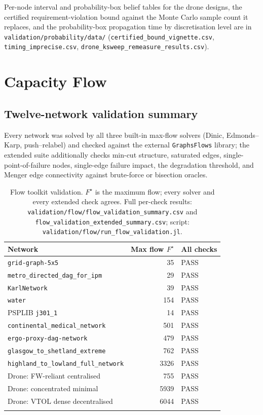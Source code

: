 \documentclass[12pt]{report}
\providecommand{\filepath}[1]{\nolinkurl{#1}}
\begin{document}
Per-node interval and probability-box belief tables for the drone designs, the certified
requirement-violation bound against the Monte Carlo sample count it replaces, and the
probability-box propagation time by discretisation level are in
\filepath{validation/probability/data/} (\filepath{certified_bound_vignette.csv},
\filepath{timing_imprecise.csv}, \filepath{drone_ksweep_remeasure_results.csv}).

\section{Capacity Flow}
\label{sec:appB-flow}

\subsection{Twelve-network validation summary}

Every network was solved by all three built-in max-flow solvers (Dinic, Edmonds--Karp,
push--relabel) and checked against the external \texttt{GraphsFlows} library; the extended
suite additionally checks min-cut structure, saturated edges, single-point-of-failure
nodes, single-edge failure impact, the degradation threshold, and Menger edge
connectivity against brute-force or bisection oracles.

{\footnotesize
\begin{longtable}{@{}l r l@{}}
\toprule
Network & Max flow $F^\star$ & All checks \\
\midrule
\endhead
\texttt{grid-graph-5x5}                  & 35   & PASS \\
\filepath{metro_directed_dag_for_ipm}  & 29   & PASS \\
\texttt{KarlNetwork}                     & 39   & PASS \\
\texttt{water}                           & 154  & PASS \\
PSPLIB \filepath{j301_1}                  & 14   & PASS \\
\filepath{continental_medical_network}   & 501  & PASS \\
\texttt{ergo-proxy-dag-network}          & 479  & PASS \\
\filepath{glasgow_to_shetland_extreme}  & 762  & PASS \\
\filepath{highland_to_lowland_full_network} & 3326 & PASS \\
Drone: FW-reliant centralised            & 755  & PASS \\
Drone: concentrated minimal              & 5939 & PASS \\
Drone: VTOL dense decentralised          & 6044 & PASS \\
\bottomrule
\caption{Flow toolkit validation. $F^\star$ is the maximum flow; every solver and every
extended check agrees. Full per-check results:
\filepath{validation/flow/flow\_validation\_summary.csv} and
\filepath{flow_validation_extended_summary.csv}; script:
\filepath{validation/flow/run\_flow\_validation.jl}.}
\label{tab:appB-flow}
\end{longtable}}
\end{document}

